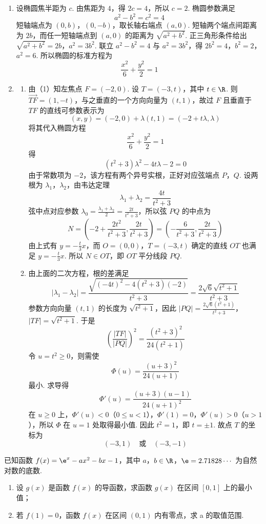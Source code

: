 \begin{solution}
\begin{enumerate}
\item 设椭圆焦半距为 \(c\). 由焦距为 \(4\)，得 \(2c=4\)，所以 \(c=2\). 椭圆参数满足
\[
a^2-b^2=c^2=4
\]
短轴端点为 \((0,b)\)，\((0,-b)\)，取长轴右端点 \((a,0)\). 短轴两个端点间距离为 \(2b\)，而任一短轴端点到 \((a,0)\) 的距离为 \(\sqrt{a^2+b^2}\). 正三角形条件给出
\(\sqrt{a^2+b^2}=2b\)，\(a^2=3b^2\).
联立 \(a^2-b^2=4\) 与 \(a^2=3b^2\)，得
\(2b^2=4\)，\(b^2=2\)，\(a^2=6\).
所以椭圆的标准方程为
\[
\frac{x^2}{6}+\frac{y^2}{2}=1
\]

\item
\begin{enumerate}
\item 由（1）知左焦点 \(F=(-2,0)\). 设 \(T=(-3,t)\)，其中 \(t\in\R\). 则 \(\overrightarrow{TF}=(1,-t)\)，与之垂直的一个方向向量为 \((t,1)\)，故过 \(F\) 且垂直于 \(TF\) 的直线可参数表示为
\[
(x,y)=(-2,0)+\lambda(t,1)=(-2+t\lambda,\lambda)
\]
将其代入椭圆方程
\[
\frac{x^2}{6}+\frac{y^2}{2}=1
\]
得
\[
(t^2+3)\lambda^2-4t\lambda-2=0
\]
由于常数项为 \(-2\)，该方程有两个异号实根，正好对应弦端点 \(P\)，\(Q\). 设两根为 \(\lambda_1\)，\(\lambda_2\)，由韦达定理
\[
\lambda_1+\lambda_2=\frac{4t}{t^2+3}
\]
弦中点对应参数 \(\lambda_0=\frac{\lambda_1+\lambda_2}{2}=\frac{2t}{t^2+3}\)，所以弦 \(PQ\) 的中点为
\[
N=\left(-2+\frac{2t^2}{t^2+3},\frac{2t}{t^2+3}\right)=\left(-\frac6{t^2+3},\frac{2t}{t^2+3}\right)
\]
由上式有 \(y=-\frac t3x\)，而 \(O=(0,0)\)，\(T=(-3,t)\) 确定的直线 \(OT\) 也满足 \(y=-\frac t3x\). 所以 \(N\in OT\)，即 \(OT\) 平分线段 \(PQ\).

\item 由上面的二次方程，根的差满足
\[
|\lambda_1-\lambda_2|
=\frac{\sqrt{(-4t)^2-4(t^2+3)(-2)}}{t^2+3}
=\frac{2\sqrt6\sqrt{t^2+1}}{t^2+3}
\]
参数方向向量 \((t,1)\) 的长度为 \(\sqrt{t^2+1}\)，因此
\(|PQ|=\frac{2\sqrt6(t^2+1)}{t^2+3}\)，\(|TF|=\sqrt{t^2+1}\).
于是
\[
\left(\frac{|TF|}{|PQ|}\right)^2=\frac{(t^2+3)^2}{24(t^2+1)}
\]
令 \(u=t^2\geqslant0\)，则需使
\[
\Phi(u)=\frac{(u+3)^2}{24(u+1)}
\]
最小. 求导得
\[
\Phi'(u)=\frac{(u+3)(u-1)}{24(u+1)^2}
\]
在 \(u\geqslant0\) 上，\(\Phi'(u)<0\)（\(0\leqslant u<1\)），\(\Phi'(1)=0\)，\(\Phi'(u)>0\)（\(u>1\)），所以 \(\Phi\) 在 \(u=1\) 处取得最小值. 因此 \(t^2=1\)，即 \(t=\pm1\). 故点 \(T\) 的坐标为
\[
(-3,1)\quad\text{或}\quad(-3,-1)
\]
\end{enumerate}
\end{enumerate}
\end{solution}

\begin{problem}
已知函数 \( f(x) = \e^{x} - ax^{2} - bx - 1 \)，其中 \(a\)，\(b \in \R\)，\(\e = 2.71828\cdots\) 为自然对数的底数.
\begin{enumerate}
\item 设 \( g(x) \) 是函数 \( f(x) \) 的导函数，求函数 \( g(x) \) 在区间 \( [0,1] \) 上的最小值；
\item 若 \( f(1)=0 \)，函数 \( f(x) \) 在区间 \( (0,1) \) 内有零点，求 a 的取值范围.
\end{enumerate}
\end{problem}

